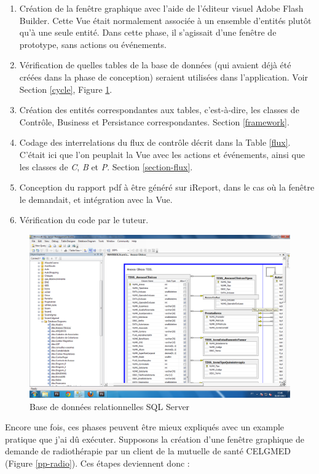 \begin{enumerate}
\item Création de la fenêtre graphique avec l'aide de l'éditeur visuel Adobe Flash Builder. Cette Vue était normalement associée à un ensemble d'entités plutôt qu'à une seule entité. Dans cette phase, il s'agissait d'une fenêtre de prototype, sans actions ou événements.
\item Vérification de quelles tables de la base de données (qui avaient déjà été créées dans la phase de conception) seraient utilisées dans l'application. Voir Section \ref{cycle}, Figure \ref{db}.
\item Création des entités correspondantes aux tables, c'est-à-dire, les classes de Contrôle, Business et Persistance correspondantes. Section \ref{framework}.
\item Codage des interrelations du flux de contrôle décrit dans la Table \ref{flux}. C'était ici que l'on peuplait la Vue avec les actions et événements, ainsi que les classes de \textit{C}, \textit{B} et \textit{P}. Section \ref{section-flux}.
\item Conception du rapport pdf à être généré sur iReport, dans le cas où la fenêtre le demandait, et intégration avec la Vue.
\item Vérification du code par le tuteur.
\end{enumerate}

\begin{figure}[h]
\begin{center}
    \includegraphics[scale=0.39]{img/db}
    \caption{Base de données relationnelles SQL Server}
	\label{db}
\end{center}
\end{figure}

Encore une fois, ces phases peuvent être mieux expliqués avec un example pratique que j'ai dû exécuter. Supposons la création d'une fenêtre graphique de demande de radiothérapie par un client de la mutuelle de santé CELGMED (Figure \ref{pp-radio}). Ces étapes deviennent donc :

